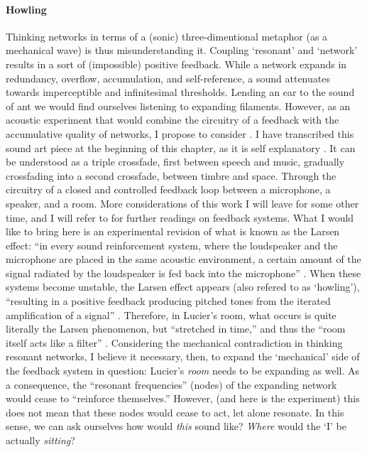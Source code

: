 \paragraph{Howling}
Thinking networks in terms of a (sonic) three-dimentional metaphor (as a mechanical wave) is thus misunderstanding it. Coupling `resonant' and `network' results in a sort of (impossible) positive feedback. While a network expands in redundancy, overflow, accumulation, and self-reference, a sound attenuates towards imperceptible and infinitesimal thresholds. Lending an ear to the sound of \gls{ant} we would find ourselves listening to expanding filaments. However, as an acoustic experiment that would combine the circuitry of a feedback with the accumulative quality of networks, I propose to consider  . I have transcribed this sound art piece at the beginning of this chapter, as it is self explanatory . It can be understood as a triple crossfade, first between speech and music, gradually crossfading into a second crossfade, between timbre and space. Through the circuitry of a closed and controlled feedback loop between a microphone, a speaker, and a room. More considerations of this work I will leave for some other time, and I will refer to \textcite{icmc/bbp2372.2012.006} for further readings on feedback systems. What I would like to bring here is an experimental revision of what is known as the Larsen effect: ``in every sound reinforcement system, where the loudspeaker and the microphone are placed in the same acoustic environment, a certain amount of the signal radiated by the loudspeaker is fed back into the microphone'' \parencite[11]{Kro11:Aco}. When these systems become unstable, the Larsen effect appears (also refered to as `howling'), ``resulting in a positive feedback producing pitched tones from the iterated amplification of a signal'' \parencite[31]{icmc/bbp2372.2012.006}. Therefore, in Lucier's room, what occurs is quite literally the Larsen phenomenon, but ``stretched in time,'' and thus the ``room itself acts like a filter'' \parencite[34]{icmc/bbp2372.2012.006}. Considering the mechanical contradiction in thinking resonant networks, I believe it necessary, then, to expand the `mechanical' side of the feedback system in question: Lucier's \textit{room} needs to be expanding as well. As a consequence, the ``resonant frequencies'' (nodes) of the expanding network would cease to ``reinforce themselves.'' However, (and here is the experiment) this does not mean that these nodes would cease to act, let alone resonate. In this sense, we can ask ourselves how would \textit{this} sound like? \textit{Where} would the `I' be actually \textit{sitting}?

